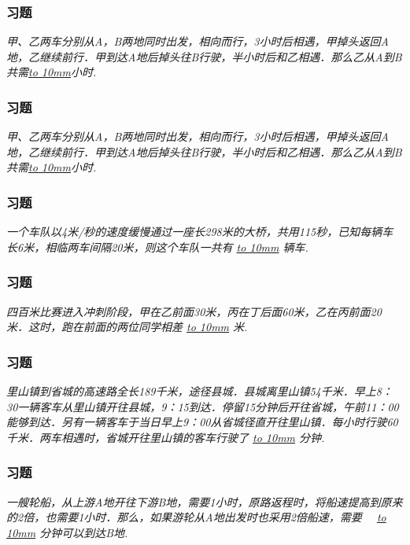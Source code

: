 \begin{frame}
    \frametitle{习题\theframecounter}
    \vspace*{-3cm}
    \textit{甲、乙两车分别从A，B两地同时出发，相向而行，3小时后相遇，甲掉头返回A地，乙继续前行．甲到达A地后掉头往B行驶，半小时后和乙相遇．那么乙从A到B共需\underline{\hbox to 10mm{}}小时.}
\end{frame}


\begin{frame}
    \frametitle{习题\theframecounter}
    \vspace*{-3cm}
    \textit{甲、乙两车分别从A，B两地同时出发，相向而行，3小时后相遇，甲掉头返回A地，乙继续前行．甲到达A地后掉头往B行驶，半小时后和乙相遇．那么乙从A到B共需\underline{\hbox to 10mm{}}小时.}
\end{frame}

\begin{frame}
    \frametitle{习题\theframecounter}
    \vspace*{-3cm}
    \textit{一个车队以4米/秒的速度缓慢通过一座长298米的大桥，共用115秒，已知每辆车长6米，相临两车间隔20米，则这个车队一共有 \underline{\hbox to 10mm{}} 辆车.}
\end{frame}


\begin{frame}
    \frametitle{习题\theframecounter}
    \vspace*{-3cm}
    \textit{四百米比赛进入冲刺阶段，甲在乙前面30米，丙在丁后面60米，乙在丙前面20米．这时，跑在前面的两位同学相差 \underline{\hbox to 10mm{}} 米.}
\end{frame}

\begin{frame}
    \frametitle{习题\theframecounter}
    \vspace*{-3cm}
    \textit{里山镇到省城的高速路全长189千米，途径县城．县城离里山镇54千米．早上8：30一辆客车从里山镇开往县城，9：15到达．停留15分钟后开往省城，午前11：00能够到达．另有一辆客车于当日早上9：00从省城径直开往里山镇．每小时行驶60千米．两车相遇时，省城开往里山镇的客车行驶了 \underline{\hbox to 10mm{}} 分钟.}
\end{frame}

\begin{frame}
    \frametitle{习题\theframecounter}
    \vspace*{-3cm}
    \textit{一艘轮船，从上游A地开往下游B地，需要1小时，原路返程时，将船速提高到原来的2倍，也需要1小时．那么，如果游轮从A地出发时也采用2倍船速，需要　 \underline{\hbox to 10mm{}} 分钟可以到达B地.}
\end{frame}

